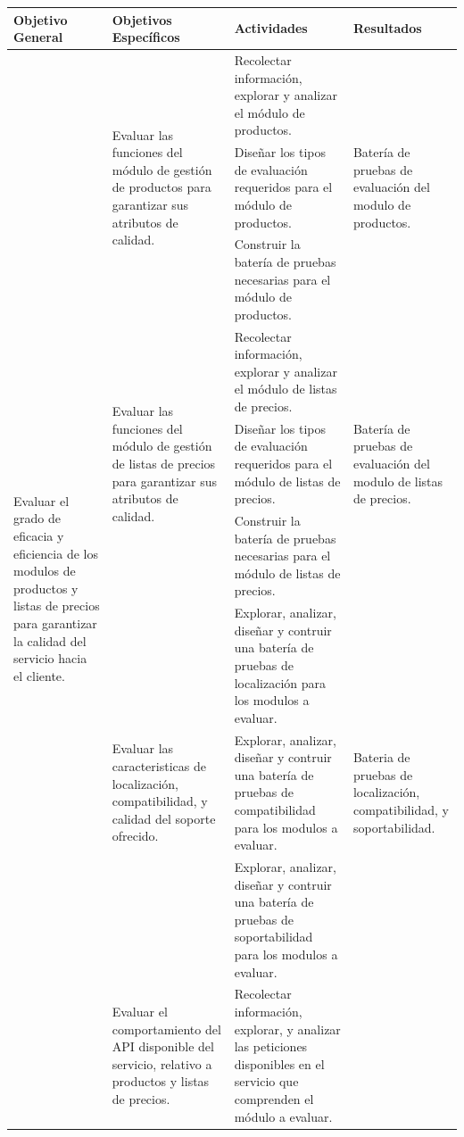 \begin{table}
\centering
\small
\begin{tabular}{|l|l|p{6.5cm}|l|}
\hline
Objetivo General & Objetivos Específicos & Actividades & Resultados \\
\hline
\multirow{15}{4.0cm}{Evaluar el grado de eficacia y eficiencia de los modulos de productos y listas de precios para garantizar la calidad del servicio hacia el cliente.} &
\multirow{3}{4.0cm}{Evaluar las funciones del módulo de gestión de productos para garantizar sus atributos de calidad.} &
Recolectar información, explorar y analizar el módulo de productos. &
\multirow{3}{4.0cm}{Batería de pruebas de evaluación del modulo de productos.} \\
\cline{3-3}
& & Diseñar los tipos de evaluación requeridos para el módulo de productos. & \\
\cline{3-3}
& & Construir la batería de pruebas necesarias para el módulo de productos. & \\
\cline{2-4}
& \multirow{3}{4.0cm}{Evaluar las funciones del módulo de gestión de listas de precios para garantizar sus atributos de calidad.} &
Recolectar información, explorar y analizar el módulo de listas de precios. &
\multirow{3}{4.0cm}{Batería de pruebas de evaluación del modulo de listas de precios.} \\
\cline{3-3}
& & Diseñar los tipos de evaluación requeridos para el módulo de listas de precios. & \\
\cline{3-3}
& & Construir la batería de pruebas necesarias para el módulo de listas de precios. & \\
\cline{2-4}
& \multirow{3}{4.0cm}{Evaluar las caracteristicas de localización, compatibilidad, y calidad del soporte ofrecido.} &
Explorar, analizar, diseñar y contruir una batería de pruebas de localización para los modulos a evaluar. &
\multirow{3}{4.0cm}{Bateria de pruebas de localización, compatibilidad, y soportabilidad.} \\
\cline{3-3}
& & Explorar, analizar, diseñar y contruir una batería de pruebas de compatibilidad para los modulos a evaluar. & \\
\cline{3-3}
& & Explorar, analizar, diseñar y contruir una batería de pruebas de soportabilidad para los modulos a evaluar. & \\
\cline{2-4}
& \multirow{3}{4.0cm}{Evaluar el comportamiento del API disponible del servicio, relativo a productos y listas de precios.} &
Recolectar información, explorar, y analizar las peticiones disponibles en el servicio que comprenden el módulo a evaluar. &

\end{tabular}
\end{table}
